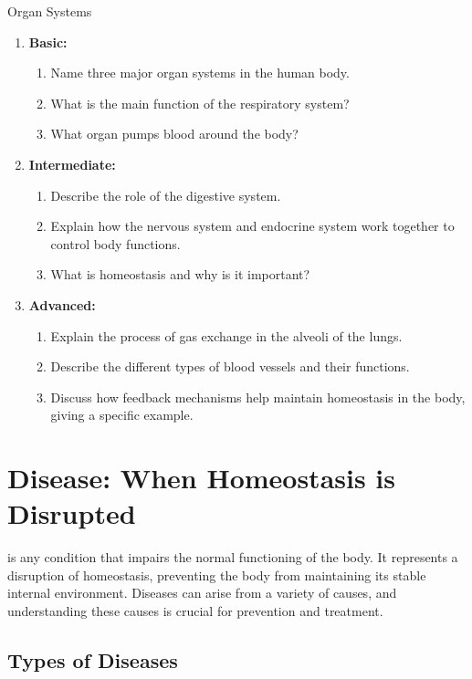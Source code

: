 \begin{tieredquestions}{Organ Systems}
\begin{enumerate}
    \item \textbf{Basic:}
    \begin{enumerate}
        \item Name three major organ systems in the human body.
        \item What is the main function of the respiratory system?
        \item What organ pumps blood around the body?
    \end{enumerate}
    \item \textbf{Intermediate:}
    \begin{enumerate}
        \item Describe the role of the digestive system.
        \item Explain how the nervous system and endocrine system work together to control body functions.
        \item What is homeostasis and why is it important?
    \end{enumerate}
    \item \textbf{Advanced:}
    \begin{enumerate}
        \item Explain the process of gas exchange in the alveoli of the lungs.
        \item Describe the different types of blood vessels and their functions.
        \item Discuss how feedback mechanisms help maintain homeostasis in the body, giving a specific example.
    \end{enumerate}
\end{enumerate}
\end{tieredquestions}

\section{Disease: When Homeostasis is Disrupted}

 is any condition that impairs the normal functioning of the body. It represents a disruption of homeostasis, preventing the body from maintaining its stable internal environment.  Diseases can arise from a variety of causes, and understanding these causes is crucial for prevention and treatment.

\subsection{Types of Diseases}


